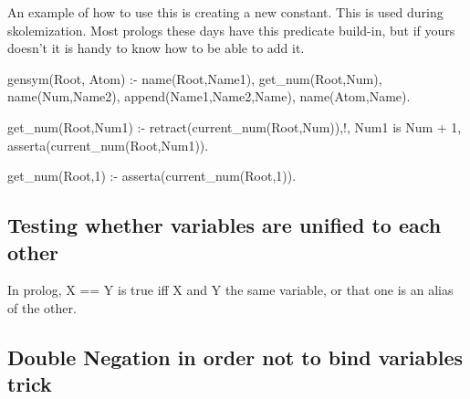 \documentclass{book}[9pt]
\newenvironment{code}%
{\small \verbatim}%
{\endverbatim \large}
\begin{document}
An example of how to use this is creating a new constant.  This is
used during skolemization.  Most prologs these days have this
predicate build-in, but if yours doesn't it is handy to know how to be
able to add it.

\begin{code}
gensym(Root, Atom) :-
        name(Root,Name1),
        get_num(Root,Num),
        name(Num,Name2),
        append(Name1,Name2,Name),
        name(Atom,Name).

get_num(Root,Num1) :-
        retract(current_num(Root,Num)),!,
        Num1 is Num + 1,
        asserta(current_num(Root,Num1)).

get_num(Root,1) :- asserta(current_num(Root,1)).
\end{code}

\subsection{Testing whether variables are unified to each other}

In prolog, X == Y is true iff X and Y the same variable, or that one
is an alias of the other.
    
\subsection{Double Negation in order not to bind variables trick}
\end{document}
